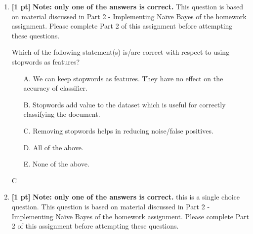 \documentclass{article}
\begin{document}
\begin{enumerate}
    \item \textbf{[1 pt]} \textbf{Note: only one of the answers is correct.}  This question is based on material discussed in Part 2 - Implementing Na{\"i}ve Bayes of the homework assignment. Please complete Part 2 of this assignment before attempting these questions.
    
    Which of the following statement(s) is/are correct with respect to using stopwords as features?
    \begin{itemize}
        \item[A.] We can keep stopwords as features. They have no effect on the accuracy of classifier.
        \item[B.] Stopwords add value to the dataset which is useful for correctly classifying the document.
        \item[C.] Removing stopwords helps in reducing noise/false positives.
        \item[D.] All of the above.
        \item[E.] None of the above.
    \end{itemize}
    \begin{tcolorbox}[width=\linewidth/3,height=1.5cm]
    C
    \end{tcolorbox}
    
    \item \textbf{[1 pt]} \textbf{Note: only one of the answers is correct.}  this is a single choice question. This question is based on material discussed in Part 2 - Implementing Na{\"i}ve Bayes of the homework assignment. Please complete Part 2 of this assignment before attempting these questions.
    

\end{enumerate}
\end{document}
